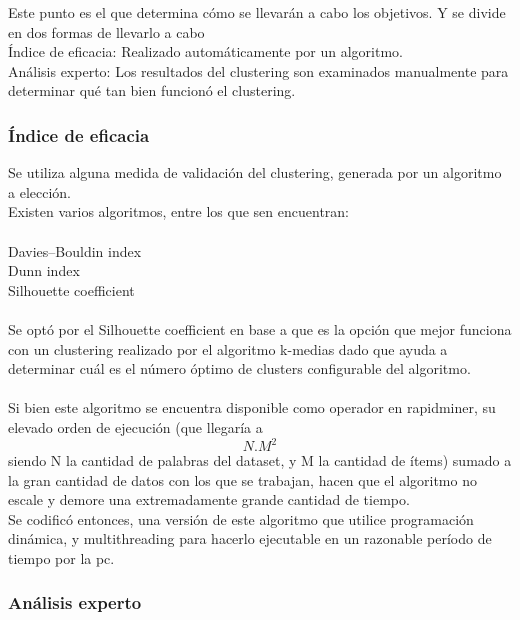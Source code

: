 Este punto es el que determina cómo se llevarán a cabo los objetivos. Y se divide en dos formas de llevarlo a cabo\\
Índice de eficacia: Realizado automáticamente por un algoritmo.\\
Análisis experto: Los resultados del clustering son examinados manualmente para determinar qué tan bien funcionó el clustering.\\

\subsubsection{Índice de eficacia}

Se utiliza alguna medida de validación del clustering, generada por un algoritmo a elección.\\
Existen varios algoritmos, entre los que sen encuentran: \\\\
Davies–Bouldin index\\
Dunn index\\
Silhouette coefficient\\
\\
Se optó por el Silhouette coefficient en base a que es la opción que mejor funciona con un clustering realizado por el algoritmo k-medias 
dado que ayuda a determinar cuál es el número óptimo de clusters configurable del algoritmo.\\
\\
Si bien este algoritmo se encuentra disponible como operador en rapidminer, su elevado orden de ejecución (que llegaría a $$N.M^{2}$$  
siendo N la cantidad de palabras del dataset, y M la cantidad de ítems) sumado a la gran cantidad de datos con los que se trabajan,
hacen que el algoritmo no escale y demore una extremadamente grande cantidad de tiempo. \\
Se codificó entonces, una versión de este algoritmo que utilice programación dinámica, y multithreading para hacerlo ejecutable en un 
razonable período de tiempo por la pc.\\

\subsubsection{Análisis experto}

